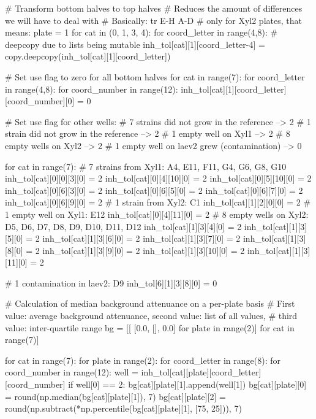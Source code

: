 \begin{pycode}
# Transform bottom halves to top halves
# Reduces the amount of differences we will have to deal with
# Basically: tr E-H A-D
# only for Xyl2 plates, that means: plate = 1
for cat in (0, 1, 3, 4):
    for coord_letter in range(4,8):
        # deepcopy due to lists being mutable
        inh_tol[cat][1][coord_letter-4] = copy.deepcopy(inh_tol[cat][1][coord_letter])

# Set use flag to zero for all bottom halves
for cat in range(7):
    for coord_letter in range(4,8):
        for coord_number in range(12):
            inh_tol[cat][1][coord_letter][coord_number][0] = 0

# Set use flag for other wells:
#    7 strains did not grow in the reference --> 2
#    1 strain did not grow in the reference --> 2
#    1 empty well on Xyl1 --> 2
#    8 empty wells on Xyl2 --> 2
#    1 empty well on laev2 grew (contamination) --> 0

for cat in range(7):
    # 7 strains from Xyl1:      A4, E11, F11, G4, G6, G8, G10
    inh_tol[cat][0][0][3][0]  = 2
    inh_tol[cat][0][4][10][0] = 2
    inh_tol[cat][0][5][10][0] = 2
    inh_tol[cat][0][6][3][0]  = 2
    inh_tol[cat][0][6][5][0]  = 2
    inh_tol[cat][0][6][7][0]  = 2
    inh_tol[cat][0][6][9][0]  = 2
    # 1 strain from Xyl2:       C1
    inh_tol[cat][1][2][0][0]  = 2
    # 1 empty well on Xyl1:     E12
    inh_tol[cat][0][4][11][0] = 2
    # 8 empty wells on Xyl2:    D5, D6, D7, D8, D9, D10, D11, D12
    inh_tol[cat][1][3][4][0]  = 2
    inh_tol[cat][1][3][5][0]  = 2
    inh_tol[cat][1][3][6][0]  = 2
    inh_tol[cat][1][3][7][0]  = 2
    inh_tol[cat][1][3][8][0]  = 2
    inh_tol[cat][1][3][9][0]  = 2
    inh_tol[cat][1][3][10][0] = 2
    inh_tol[cat][1][3][11][0] = 2

# 1 contamination in laev2: D9
inh_tol[6][1][3][8][0] = 0

# Calculation of median background attenuance on a per-plate basis
# First value: average background attenuance, second value: list of all values,
# third value: inter-quartile range
bg = [[ [0.0, [], 0.0] for plate in range(2)] for cat in range(7)]

for cat in range(7):
    for plate in range(2):
        for coord_letter in range(8):
            for coord_number in range(12):
                well = inh_tol[cat][plate][coord_letter][coord_number]
                if well[0] == 2:
                    bg[cat][plate][1].append(well[1])
        bg[cat][plate][0] = round(np.median(bg[cat][plate][1]), 7)
        bg[cat][plate][2] = round(np.subtract(*np.percentile(bg[cat][plate][1], [75, 25])), 7)


\end{pycode}
